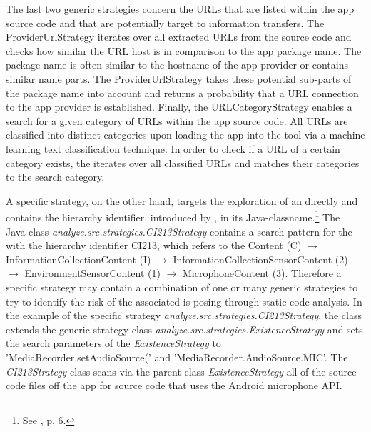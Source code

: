 The last two generic strategies concern the \acs{URL}s that are listed within the app source code and that are potentially target to information transfers.
The ProviderUrlStrategy iterates over all extracted URLs from the source code and checks how similar the URL host is in comparison to the app package name.
The package name is often similar to the hostname of the app provider or contains similar name parts. 
The ProviderUrlStrategy takes these potential sub-parts of the package name into account and returns a probability that a URL connection to the app provider is established.
Finally, the URLCategoryStrategy enables a search for a given category of URLs within the app source code.
All URLs are classified into distinct categories upon loading the app into the \sca tool via a machine learning text classification technique.
In order to check if a URL of a certain category exists, the iterates over all classified URLs and matches their categories to the search category.

A specific strategy, on the other hand, targets the exploration of an \ipp directly and contains the \ipp hierarchy identifier, introduced by \textcite{Dehling2016}, in its Java-classname.\footnote{See \cite{Dehling2016}, p. 6.}
The Java-class \textit{analyze.src.strategies.CI213\textunderscore Strategy} contains a search pattern for the \ipp with the hierarchy identifier CI213, which refers to the \ipp Content (C) $\rightarrow$ InformationCollectionContent (I) $\rightarrow$ InformationCollectionSensorContent (2) $\rightarrow$ EnvironmentSensorContent (1) $\rightarrow$ MicrophoneContent (3).
Therefore a specific strategy may contain a combination of one or many generic strategies to try to identify the risk of the associated \ipp is posing through static code analysis.
In the example of the specific strategy \textit{analyze.src.strategies.CI213\textunderscore Strategy}, the class extends the generic strategy class \textit{analyze.src.strategies.ExistenceStrategy} and sets the search parameters of the \textit{ExistenceStrategy} to 'MediaRecorder.setAudioSource(' and 'MediaRecorder.AudioSource.MIC'.
The \textit{CI213\textunderscore Strategy} class scans via the parent-class \textit{ExistenceStrategy} all of the source code files off the app for source code that uses the Android microphone \acs{API}.

